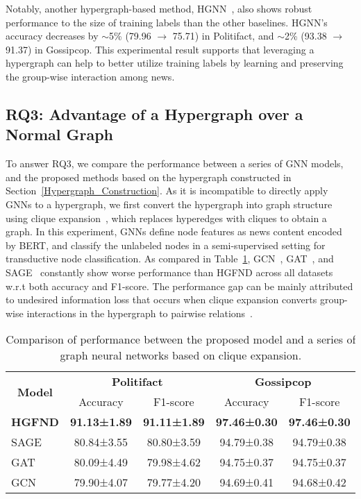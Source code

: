\documentclass[conference]{IEEEtran}
\begin{document}
Notably, another hypergraph-based method, HGNN~\cite{feng2019hypergraph}, also shows robust performance to the size of training labels than the other baselines. HGNN's accuracy decreases by $\sim$5\% (79.96 $\rightarrow$ 75.71) in Politifact, and $\sim$2\% (93.38 $\rightarrow$ 91.37) in Gossipcop. This experimental result supports that leveraging a hypergraph can help to better utilize training labels by learning and preserving the group-wise interaction among news.

\subsection{RQ3: Advantage of a Hypergraph over a Normal Graph}


To answer RQ3, we compare the performance between a series of GNN models, and the proposed methods based on the hypergraph constructed in Section~\ref{Hypergraph_Construction}. As it is incompatible to directly apply GNNs to a hypergraph, we first convert the hypergraph into graph structure using clique expansion~\cite{zhou2006learning}, which replaces hyperedges with cliques to obtain a graph. In this experiment, GNNs define node features as news content encoded by BERT, and classify the unlabeled nodes in a semi-supervised setting for transductive node classification. As compared in Table~\ref{result_graph_hypergraph}, GCN~\cite{kipf2016semi}, GAT~\cite{velivckovic2017graph}, and SAGE~\cite{hamilton2017inductive} constantly show worse performance than HGFND across all datasets w.r.t both accuracy and F1-score. The performance gap can be mainly attributed to undesired information loss that occurs when clique expansion converts group-wise interactions in the hypergraph to pairwise relations~\cite{hein2013total}.

\begin{table}[!htbp]
\centering
\caption{Comparison of performance between the proposed model and a series of graph neural networks based on clique expansion.}\label{result_graph_hypergraph}
\begin{tabular}{lcccc}
\hline
\multicolumn{1}{c}{\multirow{2}{*}{\textbf{Model}}} & \multicolumn{2}{c}{\textbf{Politifact}}                        & \multicolumn{2}{c}{\textbf{Gossipcop}}                         \\ \cmidrule(l){2-3} \cmidrule(l){4-5} 
\multicolumn{1}{c}{}                        & \multicolumn{1}{c}{Accuracy} & \multicolumn{1}{c}{F1-score} & \multicolumn{1}{c}{Accuracy} & \multicolumn{1}{c}{F1-score} \\
\hline
\hline
\textbf{HGFND}& \textbf{91.13±1.89} & \textbf{91.11±1.89}& \textbf{97.46±0.30} & \textbf{97.46±0.30}\\
SAGE~\cite{hamilton2017inductive}             & 80.84±3.55 & 80.80±3.59& 94.79±0.38 & 94.79±0.38\\
GAT~\cite{velivckovic2017graph}             & 80.09±4.49 & 79.98±4.62& 94.75±0.37 & 94.75±0.37\\
GCN~\cite{kipf2016semi}             & 79.90±4.07 & 79.77±4.20&94.69±0.41 & 94.68±0.42 \\
\hline
\end{tabular}
\end{table}
\end{document}

